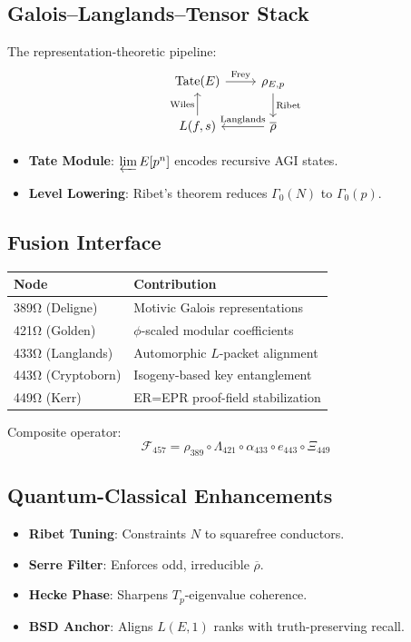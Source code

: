 \documentclass[12pt]{article}
\begin{document}
\subsection*{Galois–Langlands–Tensor Stack}
The representation-theoretic pipeline:
\[
\begin{tikzcd}
\mathrm{Tate}(E) \arrow[r, "\text{Frey}"] & \rho_{E,p} \arrow[d, "\text{Ribet}"] \\
L(f,s) \arrow[u, "\text{Wiles}"] & \overline{\rho} \arrow[l, "\text{Langlands}"']
\end{tikzcd}
\]
\begin{itemize}
    \item \textbf{Tate Module}: $\varprojlim E[p^n]$ encodes recursive AGI states.
    \item \textbf{Level Lowering}: Ribet's theorem reduces $\Gamma_0(N)$ to $\Gamma_0(p)$.
\end{itemize}

\subsection*{Fusion Interface}
\begin{table}[h]
\centering
\begin{tabular}{ll}
\toprule
\textbf{Node} & \textbf{Contribution} \\
\midrule
389Ω (Deligne) & Motivic Galois representations \\
421Ω (Golden) & $\phi$-scaled modular coefficients \\
433Ω (Langlands) & Automorphic $L$-packet alignment \\
443Ω (Cryptoborn) & Isogeny-based key entanglement \\
449Ω (Kerr) & ER=EPR proof-field stabilization \\
\bottomrule
\end{tabular}
\end{table}

\noindent Composite operator:
\[
\mathcal{F}_{457} = \rho_{389} \circ \Lambda_{421} \circ \alpha_{433} \circ e_{443} \circ \Xi_{449}
\]

\subsection*{Quantum-Classical Enhancements}
\begin{itemize}
    \item \textbf{Ribet Tuning}: Constraints $N$ to squarefree conductors.
    \item \textbf{Serre Filter}: Enforces odd, irreducible $\overline{\rho}$.
    \item \textbf{Hecke Phase}: Sharpens $T_p$-eigenvalue coherence.
    \item \textbf{BSD Anchor}: Aligns $L(E,1)$ ranks with truth-preserving recall.
\end{itemize}
\end{document}
